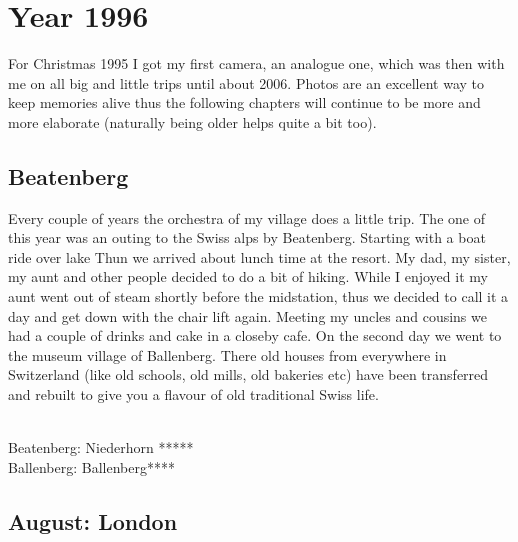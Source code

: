 \chapter{Year 1996}
\label{1996}

For Christmas 1995 I got my first camera, an analogue one, which was then with me on all big and little trips until about 2006. Photos are an excellent way to keep memories alive thus the following chapters will continue to be more and more elaborate (naturally being older helps quite a bit too).

\section{Beatenberg}
\label{1996:Beatenberg}

Every couple of years the orchestra of my village does a little trip. The one of this year was an outing to the Swiss alps by Beatenberg. Starting with a boat ride over lake Thun we arrived about lunch time at the resort. My dad, my sister, my aunt and other people decided to do a bit of hiking. While I enjoyed it my aunt went out of steam shortly before the midstation, thus we decided to call it a day and get down with the chair lift again. Meeting my uncles and cousins we had a couple of drinks and cake in a closeby cafe. On the second day we went to the museum village of Ballenberg. There old houses from everywhere in Switzerland (like old schools, old mills, old bakeries etc) have been transferred and rebuilt to give you a flavour of old traditional Swiss life. \\\

Beatenberg: Niederhorn *****\\
Ballenberg: Ballenberg****

\section{August: London}
\label{1996:London}


